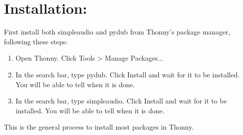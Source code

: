 \documentclass[11pt, letterpaper, onecolumn, oneside, final]{article}
\begin{document}
\maketitle

\section{Installation:}
    First install both {\consolas simpleaudio} and {\consolas pydub} from Thonny's package manager, following these steps:
\begin{enumerate}
    \item Open Thonny. Click {\consolas Tools > Manage Packages...}
    \item In the search bar, type {\consolas pydub}. Click {\consolas Install} and wait for it to be installed. You will be able to tell when it is done.
    \item In the search bar, type {\consolas simpleaudio}. Click {\consolas Install} and wait for it to be installed. You will be able to tell when it is done.
\end{enumerate}
This is the general process to install most packages in Thonny.
\end{document}
